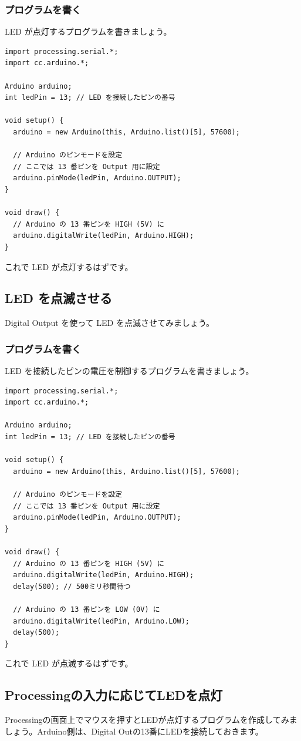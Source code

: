 \documentclass[11pt,a4paper]{jarticle}
\begin{document}
\subsubsection*{プログラムを書く}
LED が点灯するプログラムを書きましょう。
\begin{lstlisting}
import processing.serial.*;
import cc.arduino.*;
 
Arduino arduino;
int ledPin = 13; // LED を接続したピンの番号
 
void setup() {
  arduino = new Arduino(this, Arduino.list()[5], 57600);

  // Arduino のピンモードを設定
  // ここでは 13 番ピンを Output 用に設定
  arduino.pinMode(ledPin, Arduino.OUTPUT);
}
 
void draw() {
  // Arduino の 13 番ピンを HIGH (5V) に
  arduino.digitalWrite(ledPin, Arduino.HIGH);
}
\end{lstlisting}
これで LED が点灯するはずです。

\subsection{LED を点滅させる}
Digital Output を使って LED を点滅させてみましょう。

\subsubsection*{プログラムを書く}
LED を接続したピンの電圧を制御するプログラムを書きましょう。
\begin{lstlisting}
import processing.serial.*;
import cc.arduino.*;
 
Arduino arduino;
int ledPin = 13; // LED を接続したピンの番号
 
void setup() {
  arduino = new Arduino(this, Arduino.list()[5], 57600);

  // Arduino のピンモードを設定
  // ここでは 13 番ピンを Output 用に設定
  arduino.pinMode(ledPin, Arduino.OUTPUT);
}
 
void draw() {
  // Arduino の 13 番ピンを HIGH (5V) に
  arduino.digitalWrite(ledPin, Arduino.HIGH);
  delay(500); // 500ミリ秒間待つ

  // Arduino の 13 番ピンを LOW (0V) に
  arduino.digitalWrite(ledPin, Arduino.LOW);
  delay(500);
}
\end{lstlisting}
これで LED が点滅するはずです。

\subsection{Processingの入力に応じてLEDを点灯}
Processingの画面上でマウスを押すとLEDが点灯するプログラムを作成してみましょう。Arduino側は、Digital Outの13番にLEDを接続しておきます。
\end{document}
